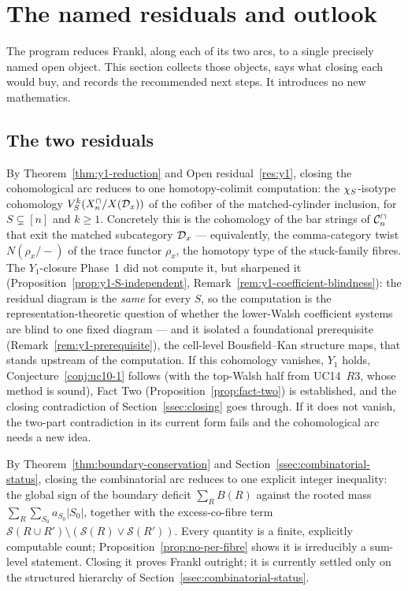 \section{The named residuals and outlook}
\label{sec:residual}

The program reduces Frankl, along each of its two arcs, to a single
precisely named open object. This section collects those objects, says
what closing each would buy, and records the recommended next steps. It
introduces no new mathematics.

\subsection{The two residuals}
\label{ssec:two-residuals}

\begin{description}[leftmargin=1.6em,style=nextline]

\item[The cohomological residual --- the $Y_1$ computation.]
By Theorem~\ref{thm:y1-reduction} and Open residual~\ref{res:y1},
closing the cohomological arc reduces to one homotopy-colimit
computation: the $\chi_{S}$-isotype cohomology
$V_{S}^{k}(X^{\cap}_n/X(\mathcal{D}_x))$ of the cofiber of the matched-cylinder
inclusion, for $S\subsetneq[n]$ and $k\ge1$. Concretely this is the
cohomology of the bar strings of $\mathcal{C}^{\cap}_n$ that exit the matched
subcategory $\mathcal{D}_x$ --- equivalently, the comma-category twist
$N(\rho_x/-)$ of the trace functor $\rho_x$, the homotopy type of the
stuck-family fibres. The $Y_1$-closure Phase~1 did not compute it, but
sharpened it (Proposition~\ref{prop:y1-S-independent},
Remark~\ref{rem:y1-coefficient-blindness}): the residual diagram is the
\emph{same} for every $S$, so the computation is the
representation-theoretic question of whether the lower-Walsh coefficient
systems are blind to one fixed diagram --- and it isolated a foundational
prerequisite (Remark~\ref{rem:y1-prerequisite}), the cell-level
Bousfield--Kan structure maps, that stands upstream of the computation.
If this cohomology vanishes, $Y_1$ holds,
Conjecture~\ref{conj:uc10-1} follows (with the top-Walsh half from
UC14~$R3$, whose method is sound), Fact Two
(Proposition~\ref{prop:fact-two}) is established, and the closing
contradiction of Section~\ref{ssec:closing} goes through. If it does
not vanish, the two-part contradiction in its current form fails and
the cohomological arc needs a new idea.

\item[The combinatorial residual --- the boundary inequality.]
By Theorem~\ref{thm:boundary-conservation} and
Section~\ref{ssec:combinatorial-status}, closing the combinatorial arc
reduces to one explicit integer inequality: the global sign of the
boundary deficit $\sum_R B(R)$ against the rooted mass
$\sum_R\sum_{S_0}a_{S_0}|S_0|$, together with the excess-co-fibre term
$\mathcal S(R\cup R')\setminus(\mathcal S(R)\vee\mathcal S(R'))$. Every
quantity is a finite, explicitly computable count;
Proposition~\ref{prop:no-per-fibre} shows it is irreducibly a
sum-level statement. Closing it proves Frankl outright; it is currently
settled only on the structured hierarchy of
Section~\ref{ssec:combinatorial-status}.


\end{description}
